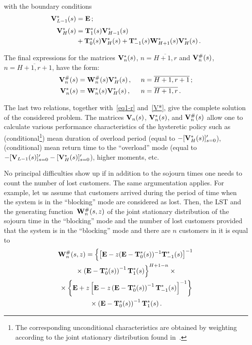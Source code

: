\begin{multicols}{2}
\noindent with the boundary conditions
\begin{align*}
\mathbf{V}^*_{L-1}(s)
&= \mathbf{E}\,;
\\[3pt]
\mathbf{V}^*_{H}(s)&=  \mathbf{T}^*_1(s)  \mathbf{V}^*_{H-1}(s)\\
&{}  + 
\mathbf{T}^*_0(s) \mathbf{V}^*_H(s)
+  \mathbf{T}^*_{-1}(s) 
\mathbf{W}^*_{H+1}(s)
\mathbf{V}^*_{H}(s)\,.
\end{align*}


The final expressions for the matrices
$\mathbf{V}^*_n(s)$, $n=\overline{H+1,r}$
and $\mathbf{V}^{\#}_n(s)$, $n=\overline{H+1,r+1}$,
have the form:
\begin{alignat*}{2}
\bmx{V}^{\#}_{n}(s)
&=  \bmx{W}^{\#}_n(s) 
\bmx{V}^*_{H}(s)\,, &\enskip n&=\overline{H+1,r+1}\,;
\\
\bmx{V}^{*}_{n}(s)
&=  \bmx{W}^{*}_n(s) 
\bmx{V}^*_{H}(s)\,, &\enskip n&=\overline{H+1,r}\,.
\end{alignat*}

The last two relations, together with~\eqref{eq1-r} and~\eqref{V*}, 
give the complete solution of the considered problem.
The matrices $\mathbf{V}_n(s)$, $\mathbf{V}^*_n(s)$, and $\mathbf{V}^{\#}_n(s)$
allow one to calculate various performance characteristics of
the hysteretic policy such as (conditional\footnote{The corresponding 
unconditional characteristics 
are obtained by weighting according to the joint stationary distribution 
found in~\cite{int0}.}) 
mean duration of overload period (equal to $-[\mathbf{V}^*_H(s)]'_{s=0}$),
(conditional) mean return time to the ``overload'' 
mode (equal to $-[\mathbf{V}_{L-1}(s)]'_{s=0}- [\mathbf{V}^*_H(s)]'_{s=0}$),
higher moments, etc.

No principal difficulties show up if in addition 
to the sojourn times one needs to count 
the number of lost customers. The same
argumentation applies. For example, 
let us assume that customers arrived during the
period of time when the system 
is in the ``blocking'' mode are considered as lost.
Then, the LST and the generating function~$\mathbf{W}^{\#}_n(s,z)$
of the joint stationary distribution of the 
sojourn time in the ``blocking'' mode 
and the number of lost customers 
provided that the system is in the ``blocking'' mode 
and there are $n$ customers in it 
is equal to 
\begin{multline*}
\mathbf{W}^{\#}_n(s,z)
=  \left \{
\left[ \mathbf{E} - z ( \mathbf{E}-\mathbf{T}^*_0(s))^{-1}\mathbf{T}^*_{-1}(s) \right]^{-1}\right.\\
\left.{}\times
\left( \mathbf{E}-\mathbf{T}^*_0(s)\right)^{-1}\mathbf{T}^*_{1}(s)
\right \}^{H+1-n}
\times{} \\
{}\times
\left \{ \mathbf{E} +  
z \left[ \mathbf{E} - z \left( \mathbf{E}-\mathbf{T}^*_0(s)\right)^{-1}
\mathbf{T}^*_{-1}(s) \right]^{-1}
\right \}\\
{}\times
\left( \mathbf{E}-\mathbf{T}^*_0(s)\right)^{-1}\mathbf{T}^*_{1}(s)\,.
\end{multline*}


\end{multicols}
